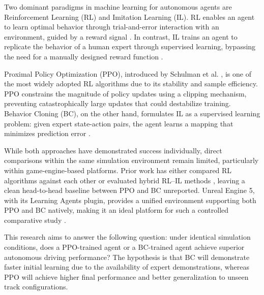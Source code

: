 \documentclass[conference]{IEEEtran}
\begin{document}
Two dominant paradigms in machine learning for autonomous agents are Reinforcement Learning (RL) and Imitation Learning (IL). RL enables an agent to learn optimal behavior through trial-and-error interaction with an environment, guided by a reward signal \cite{mnih2015human}. In contrast, IL trains an agent to replicate the behavior of a human expert through supervised learning, bypassing the need for a manually designed reward function \cite{chen2024endtoend}.

Proximal Policy Optimization (PPO), introduced by Schulman et al. \cite{schulman2017proximal}, is one of the most widely adopted RL algorithms due to its stability and sample efficiency. PPO constrains the magnitude of policy updates using a clipping mechanism, preventing catastrophically large updates that could destabilize training. Behavior Cloning (BC), on the other hand, formulates IL as a supervised learning problem: given expert state-action pairs, the agent learns a mapping that minimizes prediction error \cite{ross2011reduction}.

While both approaches have demonstrated success individually, direct comparisons within the same simulation environment remain limited, particularly within game-engine-based platforms. Prior work has either compared RL algorithms against each other \cite{muzahid2021comparison, siboo2024empirical} or evaluated hybrid RL--IL methods \cite{bronstein2022hierarchical}, leaving a clean head-to-head baseline between PPO and BC unreported. Unreal Engine 5, with its Learning Agents plugin, provides a unified environment supporting both PPO and BC natively, making it an ideal platform for such a controlled comparative study \cite{mulcahy2024learningagents}.

This research aims to answer the following question: under identical simulation conditions, does a PPO-trained agent or a BC-trained agent achieve superior autonomous driving performance? The hypothesis is that BC will demonstrate faster initial learning due to the availability of expert demonstrations, whereas PPO will achieve higher final performance and better generalization to unseen track configurations.
\end{document}
